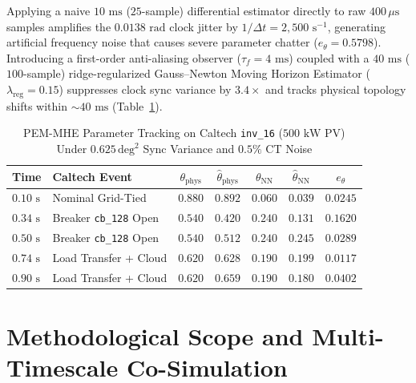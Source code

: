 \documentclass[journal]{IEEEtran}
\begin{document}
Applying a naive $10\text{ ms}$ ($25$-sample) differential estimator directly to raw $400\,\mu\text{s}$ samples amplifies the $0.0138\text{ rad}$ clock jitter by $1/\Delta t = 2{,}500\text{ s}^{-1}$, generating artificial frequency noise that causes severe parameter chatter ($e_\theta = 0.5798$). Introducing a first-order anti-aliasing observer ($\tau_f = 4\text{ ms}$) coupled with a $40\text{ ms}$ ($100$-sample) ridge-regularized Gauss--Newton Moving Horizon Estimator ($\lambda_{\text{reg}} = 0.15$) suppresses clock sync variance by $3.4\times$ and tracks physical topology shifts within $\sim 40\text{ ms}$ (Table~\ref{tab:caltech_pem_mhe}).

\begin{table}[!t]
\centering
\caption{PEM-MHE Parameter Tracking on Caltech \texttt{inv\_16} ($500\text{ kW}$ PV) Under $0.625\,\text{deg}^2$ Sync Variance and $0.5\%$ CT Noise}
\label{tab:caltech_pem_mhe}
\scriptsize
\setlength{\tabcolsep}{3.5pt}
\renewcommand{\arraystretch}{1.15}
\begin{tabular}{@{}llccccc@{}}
\toprule
\textbf{Time} & \textbf{Caltech Event} & $\theta_{\text{phys}}$ & $\hat{\theta}_{\text{phys}}$ & $\theta_{\text{NN}}$ & $\hat{\theta}_{\text{NN}}$ & $e_\theta$ \\
\midrule
$0.10\text{ s}$ & Nominal Grid-Tied & $0.880$ & $0.892$ & $0.060$ & $0.039$ & $0.0245$ \\
$0.34\text{ s}$ & Breaker \texttt{cb\_128} Open & $0.540$ & $0.420$ & $0.240$ & $0.131$ & $0.1620$ \\
$0.50\text{ s}$ & Breaker \texttt{cb\_128} Open & $0.540$ & $0.512$ & $0.240$ & $0.245$ & $0.0289$ \\
$0.74\text{ s}$ & Load Transfer + Cloud & $0.620$ & $0.628$ & $0.190$ & $0.199$ & $0.0117$ \\
$0.90\text{ s}$ & Load Transfer + Cloud & $0.620$ & $0.659$ & $0.190$ & $0.180$ & $0.0402$ \\
\bottomrule
\end{tabular}
\end{table}

\section{Methodological Scope and Multi-Timescale Co-Simulation}
\end{document}
